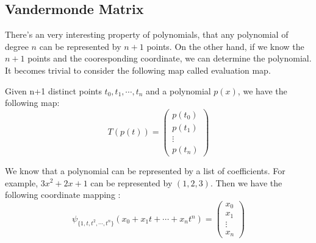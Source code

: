 \subsection{Vandermonde Matrix}

There's an very interesting property of polynomials, that any polynomial of degree $n$ can be represented by $n+1$ points. On the other hand, if we know the $n+1$ points and the cooresponding coordinate, we can determine the polynomial.\\

It becomes trivial to consider the following map called evaluation map. 
\begin{definition}
    Given n+1 distinct points $t_0,t_1,\cdots,t_n$ and a polynomial $p(x)$, we have the following map:
    $$T(p(t)) = \begin{pmatrix}
        p(t_0)\\p(t_1)\\ \vdots\\p(t_n)
    \end{pmatrix}$$

\end{definition}

We know that a polynomial can be represented by a list of coefficients. For example, $3x^2+2x+1$ can be represented by $(1,2,3)$. Then we have the following coordinate mapping :
$$\psi_{\{1,t,t^2,\cdots,t^n\}}(x_0+x_1t+\cdots+x_nt^n) = \begin{pmatrix}
    x_0\\x_1\\ \vdots \\x_n
    \end{pmatrix}$$

